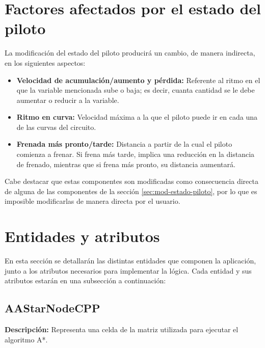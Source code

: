 \section{Factores afectados por el estado del piloto}
\label{sec:componente-estado}

La modificación del estado del piloto producirá un cambio, de manera indirecta, en los siguientes aspectos:

\begin{itemize}
    \item \textbf{Velocidad de acumulación/aumento y pérdida: }Referente al ritmo en el que la variable mencionada sube o baja; es decir, cuanta cantidad se le debe aumentar o reducir a la variable.
    \item \textbf{Ritmo en curva: }Velocidad máxima a la que el piloto puede ir en cada una de las curvas del circuito.
    \item \textbf{Frenada más pronto/tarde: }Distancia a partir de la cual el piloto comienza a frenar. Si frena más tarde, implica una reducción en la distancia de frenado, mientras que si frena más pronto, su distancia aumentará.
\end{itemize}

Cabe destacar que estas componentes son modificadas como consecuencia directa de alguna de las componentes de la sección \ref{sec:mod-estado-piloto}, por lo que es imposible modificarlas de manera directa por el usuario.

\newpage

\section{Entidades y atributos}

En esta sección se detallarán las distintas entidades que componen la aplicación, junto a los atributos necesarios para implementar la lógica. Cada entidad y sus atributos estarán en una subsección a continuación:

\subsection{AAStarNodeCPP}
\textbf{Descripción: }Representa una celda de la matriz utilizada para ejecutar el algoritmo A*.

